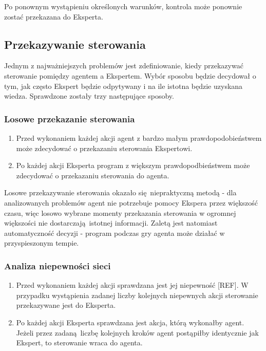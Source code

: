 Po ponownym wystąpieniu określonych warunków, kontrola może ponownie zostać przekazana do Eksperta.

\subsection{Przekazywanie sterowania}
Jednym z najważniejszych problemów jest zdefiniowanie, kiedy przekazywać sterowanie pomiędzy agentem a Ekspertem. Wybór sposobu będzie decydował o tym, jak często Ekspert będzie odpytywany i na ile istotna będzie uzyskana wiedza. Sprawdzone zostały trzy następujące sposoby.

\subsubsection{Losowe przekazanie sterowania}
\begin{enumerate}
\item Przed wykonaniem każdej akcji agent z bardzo małym prawdopodobieństwem może zdecydować o przekazaniu sterowania Ekspertowi.
\item Po każdej akcji Eksperta program z większym prawdopodbieństwem może zdecydować o przekazaniu sterowania do agenta.
\end{enumerate}

Losowe przekazywanie sterowania okazało się niepraktyczną metodą - dla analizowanych problemów agent nie potrzebuje pomocy Ekspera przez większość czasu, więc losowo wybrane momenty przekazania sterowania w ogromnej większości nie dostarczają istotnej informacji. Zaletą jest natomiast automatyczność decyzji - program podczas gry agenta może działać w przyspieszonym tempie.

\subsubsection{Analiza niepewności sieci}
\begin{enumerate}
\item Przed wykonaniem każdej akcji sprawdzana jest jej niepewność [REF]. W przypadku wystąpienia zadanej liczby kolejnych niepewnych akcji sterowanie przekazywane jest do Eksperta.
\item Po każdej akcji Eksperta sprawdzana jest akcja, którą wykonałby agent. Jeżeli przez zadaną liczbę kolejnych kroków agent postąpiłby identycznie jak Ekspert, to sterowanie wraca do agenta.
\end{enumerate}

